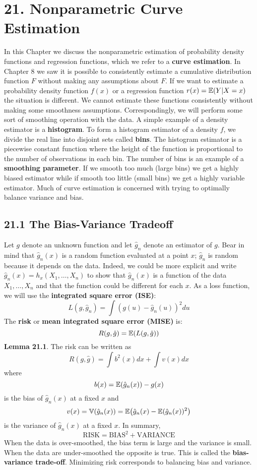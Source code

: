 \section*{21. Nonparametric Curve Estimation}\label{nonparametric-curve-estimation}
In this Chapter we discuss the nonparametric estimation of probability density functions and regression functions, which we refer to a \textbf{curve estimation}.
In Chapter 8 we saw it is possible to consistently estimate a cumulative distribution function \(F\) without making any assumptions about \(F\). If we want to estimate a probability density function \(f(x)\) or a regression function \(r(x) = \operatorname{\mathbb{E}}(Y | X = x)\) the situation is different. We cannot estimate these functions consistently without making some smoothness assumptions. Correspondingly, we will perform some sort of smoothing operation with the data.
A simple example of a density estimator is a \textbf{histogram}. To form a histogram estimator of a density \(f\), we divide the real line into disjoint sets called \textbf{bins}. The histogram estimator is a piecewise constant function where the height of the function is proportional to the number of observations in each bin. The number of bins is an example of a \textbf{smoothing parameter}. If we smooth too much (large bins) we get a highly biased estimator while if smooth too little (small bins) we get a highly variable estimator. Much of curve estimation is concerned with trying to optimally balance variance and bias.

\subsection*{21.1 The Bias-Variance Tradeoff}\label{the-bias-variance-tradeoff}
Let \(g\) denote an unknown function and let \(\hat{g}_{n}\) denote an estimator of \(g\). Bear in mind that \(\hat{g}_{n}(x)\) is a random function evaluated at a point \(x\); \(\hat{g}_{n}\) is random because it depends on the data. Indeed, we could be more explicit and write \(\hat{g}_{n}(x) = h_x(X_{1}, \dots, X_{n})\) to show that \(\hat{g}_{n}(x)\) is a function of the data \(X_{1}, \dots, X_{n}\) and that the function could be different for each \(x\).
As a loss function, we will use the \textbf{integrated square error (ISE)}:
\[
L(g, \hat{g}_{n}) = \int (g(u) - \hat{g}_{n}(u))^{2} du
\]
The \textbf{risk} or \textbf{mean integrated square error (MISE)} is:
\[
R(g, \hat{g}) = \EXP\left(L(g, \hat{g}) \right)
\]
\textbf{Lemma 21.1}. The risk can be written as
\[
R(g, \hat{g}) = \int b^{2}(x) dx + \int v(x) dx
\]
where
\[
b(x) = \operatorname{\mathbb{E}}(\hat{g}_{n}(x)) - g(x)
\]
is the bias of \(\hat{g}_{n}(x)\) at a fixed \(x\) and
\[
v(x) = \VAR(\hat{g}_{n}(x)) = \EXP\left( \hat{g}_{n}(x) - \EXP(\hat{g}_{n}(x))^{2}\right)
\]
is the variance of \(\hat{g}_{n}(x)\) at a fixed \(x\).
In summary,
\[
\text{RISK} = \text{BIAS}^{2} + \text{VARIANCE}
\]
When the data is over-smoothed, the bias term is large and the variance is small. When the data are under-smoothed the opposite is true. This is called the \textbf{bias-variance trade-off}. Minimizing risk corresponds to balancing bias and variance.

